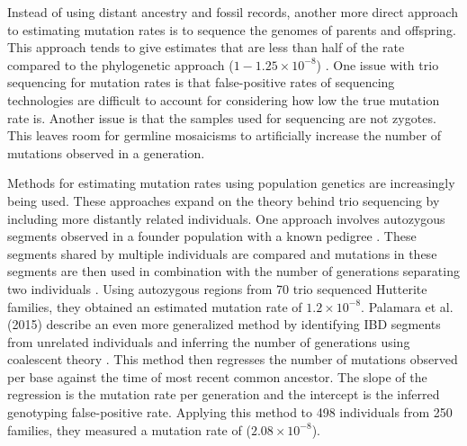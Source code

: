 \documentclass[
11pt, %
oneside, %
english, %
doublespacing, %
headsepline, %
chapterinoneline, %
]{MastersDoctoralThesis} %
\begin{document}
Instead of using distant ancestry and fossil records, another more direct approach to estimating mutation rates is to sequence the genomes of parents and offspring. 
This approach tends to give estimates that are less than half of the rate compared to the phylogenetic approach ($1-1.25\times10^{-8}$) \citep{Shendure2015,Narasimhan2016}.
One issue with trio sequencing for mutation rates is that false-positive rates of sequencing technologies are difficult to account for considering how low the true mutation rate is.
Another issue is that the samples used for sequencing are not zygotes.
This leaves room for germline mosaicisms to artificially increase the number of mutations observed in a generation.

Methods for estimating mutation rates using population genetics are increasingly being used.
These approaches expand on the theory behind trio sequencing by including more distantly related individuals.
One approach involves autozygous segments observed in a founder population with a known pedigree \citep{Campbell2012}.
These segments shared by multiple individuals are compared and mutations in these segments are then used in combination with the number of generations separating two individuals \citep{Campbell2012}.
Using autozygous regions from 70 trio sequenced Hutterite families, they obtained an estimated mutation rate of $1.2\times10^{-8}$.
Palamara et al. (2015) describe an even more generalized method by identifying IBD segments from unrelated individuals and inferring the number of generations using coalescent theory \citep{Palamara2015,Baharian2016}.
This method then regresses the number of mutations observed per base against the time of most recent common ancestor.
The slope of the regression is the mutation rate per generation and the intercept is the inferred genotyping false-positive rate.
Applying this method to 498 individuals from 250 families, they measured a mutation rate of ($2.08\times10^{-8}$).
\end{document}
